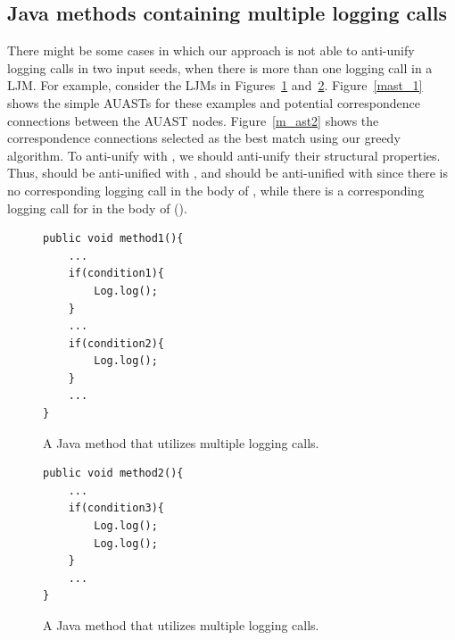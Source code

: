

\subsection{Java methods containing multiple logging calls} \label{meth-multipleLogs}
There might be some cases in which our approach is not able to anti-unify logging calls in two input seeds, when there is more than one logging call in a LJM. For example, consider the LJMs in Figures~\ref{multiple1} and~\ref{multiple2}. Figure~\ref{mast_1} shows the simple AUASTs for these examples and potential correspondence connections between the AUAST nodes. Figure~\ref{m_ast2} shows the correspondence connections selected as the best match using our greedy algorithm. To anti-unify  with , we should anti-unify their structural properties. Thus,  should be anti-unified with , and  should be anti-unified with \NIL{} since there is no corresponding logging call in the body of , while there is a corresponding logging call for  in the body of  ().


\begin{figure}[H]
\def\baselinestretch{1}
\begin{lstlisting}
public void method1(){
	...
	if(condition1){
		Log.log();
	}
	...
	if(condition2){
		Log.log();
	}
	...
}
\end{lstlisting}
\caption{A Java method that utilizes multiple logging calls.\label{multiple1}}
\end{figure}



\begin{figure}[H]
\def\baselinestretch{1}
\begin{lstlisting}
public void method2(){
	...
	if(condition3){
		Log.log();
		Log.log();
	}
	...
}
\end{lstlisting}
\caption{A Java method that utilizes multiple logging calls.\label{multiple2}}
\end{figure}

